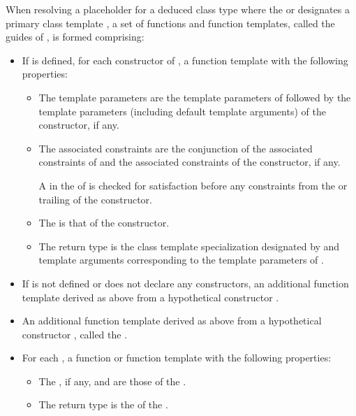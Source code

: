 \pnum
When resolving a placeholder for a deduced class type
where the  or 
designates a primary class template ,
a set of functions and function templates, called the guides of ,
is formed comprising:
\begin{itemize}
\item
If  is defined,
for each constructor of ,
a function template with the following properties:
\begin{itemize}
\item
The template parameters are the template parameters of 
followed
by the template parameters (including default template arguments) of the constructor,
if any.
\item
The associated constraints are the conjunction of
the associated constraints of  and
the associated constraints of the constructor, if any.
\begin{note}
A  in
the  of 
is checked for satisfaction before any constraints from
the  or trailing 
of the constructor.
\end{note}
\item
The  is that of the constructor.
\item
The return type is the class template specialization
designated by 
and template arguments
corresponding to the template parameters of .
\end{itemize}

\item
If 
is not defined or does not declare any constructors,
an additional function template derived as above
from a hypothetical constructor .

\item
An additional function template derived as above
from a hypothetical constructor ,
called the .

\item
For each ,
a function or function template
with the following properties:

\begin{itemize}
\item
The , if any,
and 
are those of the .
\item
The return type
is the 
of the .
\end{itemize}
\end{itemize}
